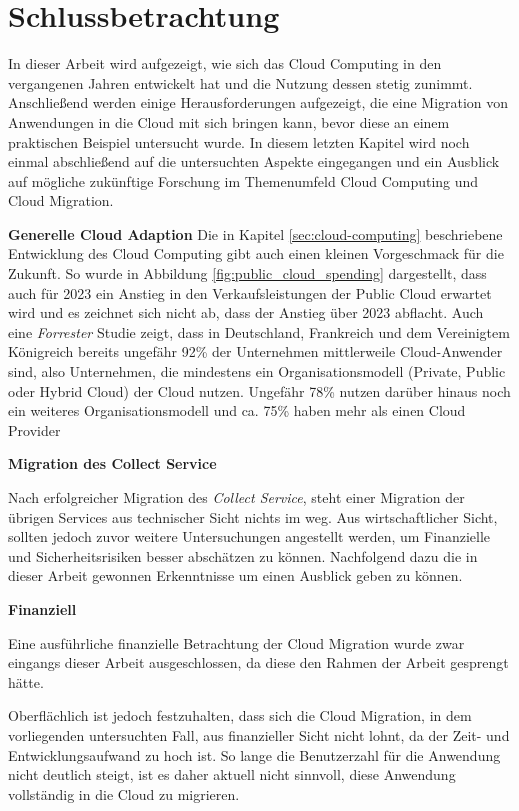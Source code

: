 \chapter{Schlussbetrachtung}
\label{chap:schlussbetrachtung}
In dieser Arbeit wird aufgezeigt, wie sich das Cloud Computing in den vergangenen Jahren entwickelt hat und die Nutzung dessen stetig zunimmt. Anschließend werden einige Herausforderungen aufgezeigt, die eine Migration von Anwendungen in die Cloud mit sich bringen kann, bevor diese an einem praktischen Beispiel untersucht wurde. In diesem letzten Kapitel wird noch einmal abschließend auf die untersuchten Aspekte eingegangen und ein Ausblick auf mögliche zukünftige Forschung im Themenumfeld Cloud Computing und Cloud Migration.

\textbf{Generelle Cloud Adaption}
Die in Kapitel \ref{sec:cloud-computing} beschriebene Entwicklung des Cloud Computing gibt auch einen kleinen Vorgeschmack für die Zukunft. So wurde in Abbildung \ref{fig:public_cloud_spending} dargestellt, dass auch für 2023 ein Anstieg in den Verkaufsleistungen der Public Cloud erwartet wird und es zeichnet sich nicht ab, dass der Anstieg über 2023 abflacht. Auch eine \textit{Forrester} Studie zeigt, dass in Deutschland, Frankreich und dem Vereinigtem Königreich bereits ungefähr 92\% der Unternehmen mittlerweile Cloud-Anwender sind, also Unternehmen, die mindestens ein Organisationsmodell (Private, Public oder Hybrid Cloud) der Cloud nutzen. Ungefähr 78\% nutzen darüber hinaus noch ein weiteres Organisationsmodell und ca. 75\% haben mehr als einen Cloud Provider \cite[Vgl.][S. 4]{Rajamani2022} 

\textbf{Migration des Collect Service}

Nach erfolgreicher Migration des \textit{Collect Service}, steht einer Migration der übrigen Services aus technischer Sicht nichts im weg. Aus wirtschaftlicher Sicht, sollten jedoch zuvor weitere Untersuchungen angestellt werden, um Finanzielle und Sicherheitsrisiken besser abschätzen zu können. Nachfolgend dazu die in dieser Arbeit gewonnen Erkenntnisse um einen Ausblick geben zu können.

\textbf{Finanziell}

Eine ausführliche finanzielle Betrachtung der Cloud Migration wurde zwar eingangs dieser Arbeit ausgeschlossen, da diese den Rahmen der Arbeit gesprengt hätte.

Oberflächlich ist jedoch festzuhalten, dass sich die Cloud Migration, in dem vorliegenden untersuchten Fall, aus finanzieller Sicht nicht lohnt, da der Zeit- und Entwicklungsaufwand zu hoch ist. So lange die Benutzerzahl für die Anwendung nicht deutlich steigt, ist es daher aktuell nicht sinnvoll, diese Anwendung vollständig in die Cloud zu migrieren.

